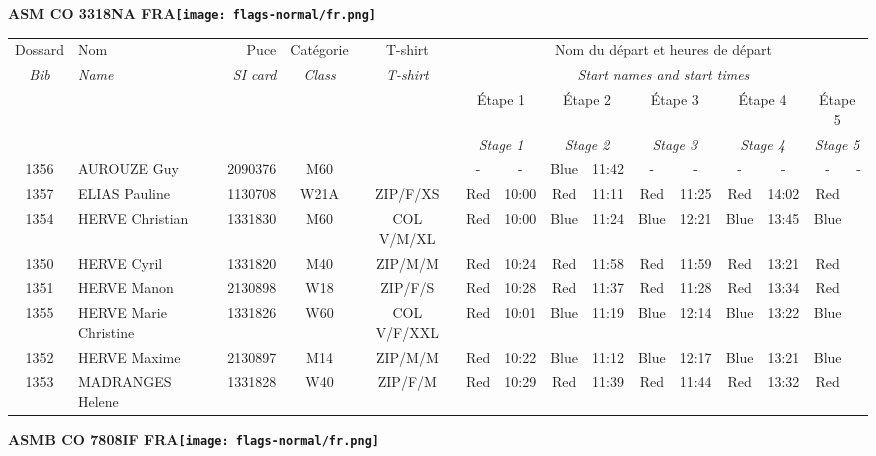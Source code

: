 \documentclass{report}
\begin{document}
\newpage
  \Huge \centering \bfseries ASM CO 3318NA FRA\normalfont \footnotesize \sffamily \hfill \texttt{[image: flags-normal/fr.png]} \newline 
  \begin{longtable}{|c|l|r|c|c|*{5}{cc|}}
    Dossard & Nom  & Puce    & Catégorie & T-shirt & \multicolumn{10}{c|}{Nom du départ et heures de départ} \\
    \itshape Bib     & \itshape Name & \itshape SI card & \itshape Class  & \itshape  T-shirt  & \multicolumn{10}{c|}{\itshape Start names and start times} \\
    \hline
    & & & & & \multicolumn{2}{c|}{Étape 1} & \multicolumn{2}{c|}{Étape 2} & \multicolumn{2}{c|}{Étape 3} & \multicolumn{2}{c|}{Étape 4} & \multicolumn{2}{c|}{Étape 5} \\
    & & & & & \multicolumn{2}{c|}{\itshape Stage 1} & \multicolumn{2}{c|}{\itshape Stage 2} & \multicolumn{2}{c|}{\itshape Stage 3} & \multicolumn{2}{c|}{\itshape Stage 4} & \multicolumn{2}{c|}{\itshape Stage 5} \\
    \hline
    1356 & AUROUZE Guy & 2090376 & M60 &   & - &  - & Blue & 11:42 & - &  - & - &  - & - &  -\\
    1357 & ELIAS Pauline & 1130708 & W21A & ZIP/F/XS & Red & 10:00 & Red & 11:11 & Red & 11:25 & Red & 14:02 & Red &  \\
    1354 & HERVE Christian & 1331830 & M60 & COL V/M/XL & Red & 10:00 & Blue & 11:24 & Blue & 12:21 & Blue & 13:45 & Blue &  \\
    1350 & HERVE Cyril & 1331820 & M40 & ZIP/M/M & Red & 10:24 & Red & 11:58 & Red & 11:59 & Red & 13:21 & Red &  \\
    1351 & HERVE Manon & 2130898 & W18 & ZIP/F/S & Red & 10:28 & Red & 11:37 & Red & 11:28 & Red & 13:34 & Red &  \\
    1355 & HERVE Marie Christine & 1331826 & W60 & COL V/F/XXL & Red & 10:01 & Blue & 11:19 & Blue & 12:14 & Blue & 13:22 & Blue &  \\
    1352 & HERVE Maxime & 2130897 & M14 & ZIP/M/M & Red & 10:22 & Blue & 11:12 & Blue & 12:17 & Blue & 13:21 & Blue &  \\
    1353 & MADRANGES Helene & 1331828 & W40 & ZIP/F/M & Red & 10:29 & Red & 11:39 & Red & 11:44 & Red & 13:32 & Red &  \\
  \end{longtable}
\newpage
  \Huge \centering \bfseries ASMB CO 7808IF FRA\normalfont \footnotesize \sffamily \hfill \texttt{[image: flags-normal/fr.png]} \newline 
\end{document}
